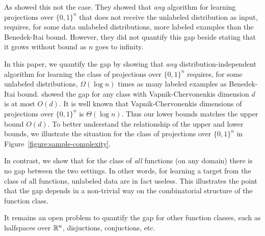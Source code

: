 As \citet{Darnstadt-Simon-Szorenyi-2013} showed this not the case. They showed
that \emph{any} algorithm for learning projections over $\{0,1\}^n$ that does
not receive the unlabeled distribution as input, requires, for some data
unlabeled distributions, more labeled examples than the Benedek-Itai bound.
However, they did not quantify this gap beside stating that it grows without
bound as $n$ goes to infinity.

In this paper, we quantify the gap by showing that \emph{any}
distribution-independent algorithm for learning the class of projections over
$\{0,1\}^n$ requires, for some unlabeled distributions, $\Omega(\log n)$ times
as many labeled examples as Benedek-Itai bound.
\citet{Darnstadt-Simon-Szorenyi-2013} showed the gap for any class with
Vapnik-Chervonenkis dimension $d$ is at most $O(d)$. It is well known that
Vapnik-Chervonenkis dimensions of projections over $\{0,1\}^n$ is $\Theta(\log
n)$. Thus our lower bounds matches the upper bound $O(d)$. To better understand
the relationship of the upper and lower bounds, we illustrate the situation for
the class of projections over $\{0,1\}^n$ in
Figure~\ref{figure:sample-complexity}.

In contrast, we show that for the class of \emph{all} functions (on any domain)
there is no gap between the two settings. In other words, for learning
a target from the class of all functions, unlabeled data are in fact useless.
This illustrates the point that the gap depends in a non-trivial way on
the combinatorial structure of the function class.

It remains an open problem to quantify the gap for other function
classes, such as halfspaces over $\mathbb{R}^n$, disjuctions, conjuctions, etc.

